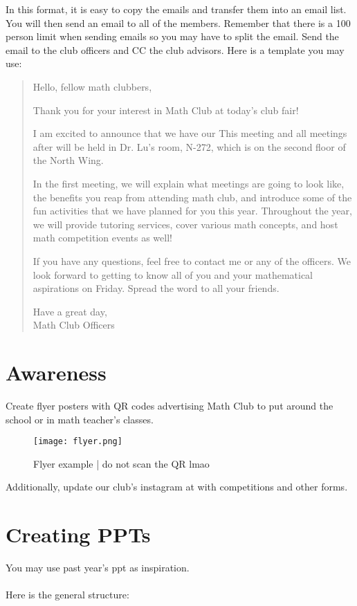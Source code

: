 In this format, it is easy to copy the emails and transfer them into an email list.
You will then send an email to all of the members. Remember that there is a 100 person limit
when sending emails so you may have to split the email. Send the email to the club officers and
CC the club advisors. Here is a template you may use:

\begin{quote}
Hello, fellow math clubbers,
 
Thank you for your interest in Math Club at today's club fair!

I am excited to announce that we have our  This meeting and all meetings after will be held in Dr. Lu's room, N-272, which is on the second floor of the North Wing.
 
In the first meeting, we will explain what meetings are going to look like, the benefits you reap from attending math club, and introduce some of the fun activities that we have planned for you this year. Throughout the year, we will provide tutoring services, cover various math concepts, and host math competition events as well! 

If you have any questions, feel free to contact me or any of the officers.
We look forward to getting to know all of you and your mathematical aspirations on Friday. Spread the word to all your friends.

Have a great day, \\
Math Club Officers
\end{quote}


\section{Awareness}
    Create flyer posters with QR codes advertising Math Club to put around the school or in math teacher's classes. 
    \begin{figure}[H]
        \centering
        \texttt{[image: flyer.png]}
        \caption{Flyer example | do not scan the QR lmao}
    \end{figure}
    
    
    Additionally, update our club's instagram at  with competitions
    and other forms.

\section{Creating PPTs}
You may use past year's ppt as inspiration. \\\\ Here is the general structure:

